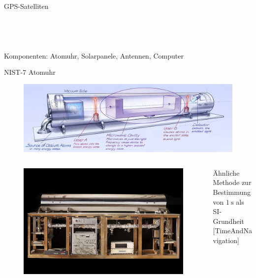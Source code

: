 \begin{frame}{GPS-Satelliten}
\begin{columns}
\begin{column}{0.5\textwidth}
\begin{figure}
            \end{figure}
        \end{column}
    \end{columns}~\\~\\
    Komponenten: Atomuhr, Solarpanele, Antennen, Computer \;
\end{frame}

\begin{frame}{NIST-7 Atomuhr}
    \begin{figure}
        \centering
        \includegraphics[width=\textwidth]{images/nist-7.jpg}
    \end{figure}
    \begin{columns}
        \begin{column}{0.5\textwidth}
            \begin{figure}
                \centering
                \includegraphics[height=0.4\textheight]{images/nist-7-real.jpg}
            \end{figure}
        \end{column}
        \begin{column}{0.5\textwidth}
            Ähnliche Methode zur Bestimmung\\
            von $\SI{1}{\second}$ als SI-Grundheit\\
            {\small [TimeAndNavigation]}
        \end{column}
    \end{columns}
\end{frame}

